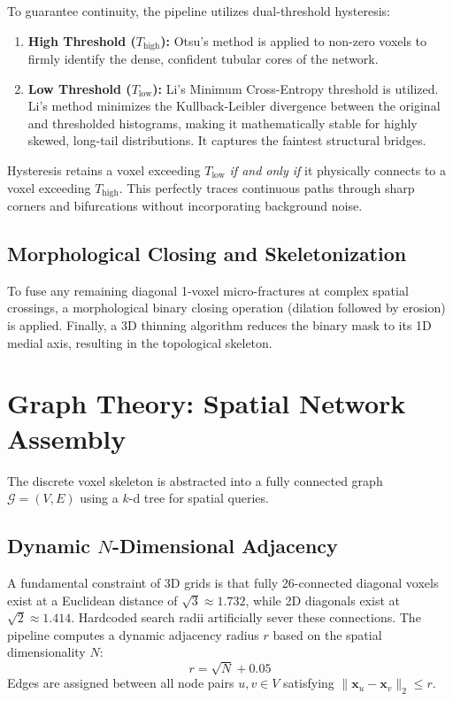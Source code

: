 \documentclass[11pt, a4paper]{article}
\begin{document}
To guarantee continuity, the pipeline utilizes dual-threshold hysteresis:
\begin{enumerate}
    \item \textbf{High Threshold ($T_{\text{high}}$):} Otsu's method is applied to non-zero voxels to firmly identify the dense, confident tubular cores of the network.
    \item \textbf{Low Threshold ($T_{\text{low}}$):} Li's Minimum Cross-Entropy threshold is utilized. Li's method minimizes the Kullback-Leibler divergence between the original and thresholded histograms, making it mathematically stable for highly skewed, long-tail distributions. It captures the faintest structural bridges.
\end{enumerate}
Hysteresis retains a voxel exceeding $T_{\text{low}}$ \textit{if and only if} it physically connects to a voxel exceeding $T_{\text{high}}$. This perfectly traces continuous paths through sharp corners and bifurcations without incorporating background noise.

\subsection{Morphological Closing and Skeletonization}
To fuse any remaining diagonal 1-voxel micro-fractures at complex spatial crossings, a morphological binary closing operation (dilation followed by erosion) is applied. Finally, a 3D thinning algorithm reduces the binary mask to its 1D medial axis, resulting in the topological skeleton.

\section{Graph Theory: Spatial Network Assembly}
The discrete voxel skeleton is abstracted into a fully connected graph $\mathcal{G} = (V, E)$ using a $k$-d tree for spatial queries.

\subsection{Dynamic $N$-Dimensional Adjacency}
A fundamental constraint of 3D grids is that fully 26-connected diagonal voxels exist at a Euclidean distance of $\sqrt{3} \approx 1.732$, while 2D diagonals exist at $\sqrt{2} \approx 1.414$. Hardcoded search radii artificially sever these connections. The pipeline computes a dynamic adjacency radius $r$ based on the spatial dimensionality $N$:
\begin{equation}
    r = \sqrt{N} + 0.05
\end{equation}
Edges are assigned between all node pairs $u, v \in V$ satisfying $\| \bm{x}_u - \bm{x}_v \|_2 \le r$.
\end{document}
